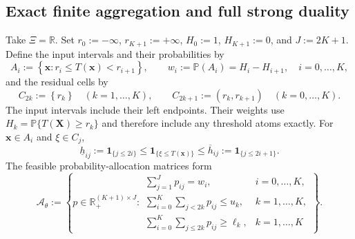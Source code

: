 \subsection{Exact finite aggregation and full strong duality}
\label{app-finite-aggregation}

Take $\Xi=\mathbb R$. Set $r_0:=-\infty$, $r_{K+1}:=+\infty$, $H_0:=1$, $H_{K+1}:=0$, and $J:=2K+1$. Define the input intervals and their probabilities by
\begin{equation}
  A_i:=\left\{\bm x:r_i\le T(\bm x)<r_{i+1}\right\},\qquad
  w_i:=\mathbb P\left(A_i\right)=H_i-H_{i+1},\quad i=0,\ldots,K,
  \label{eq-input-cells}
\end{equation}
and the residual cells by
\begin{equation}
  C_{2k}:=\left\{r_k\right\}\quad(k=1,\ldots,K),\qquad
  C_{2k+1}:=\left(r_k,r_{k+1}\right)\quad(k=0,\ldots,K).
  \label{eq-residual-cells}
\end{equation}
The input intervals include their left endpoints. Their weights use $H_k=\mathbb P\{T(\bm X)\ge r_k\}$ and therefore include any threshold atoms exactly. For $\bm x\in A_i$ and $\xi\in C_j$,
\begin{equation}
  \underline h_{ij}:=\mathbf1_{\{j\le2i\}}
  \le\mathbf1_{\{\xi\le T(\bm x)\}}
  \le\overline h_{ij}:=\mathbf1_{\{j\le2i+1\}}.
  \label{eq-cell-costs}
\end{equation}
The feasible probability-allocation matrices form
\begin{equation}
  \mathcal A_\theta:=\left\{p\in\mathbb R_+^{(K+1)\times J}:
  \begin{array}{ll}
    \displaystyle\sum_{j=1}^Jp_{ij}=w_i,&i=0,\ldots,K,\\[1mm]
    \displaystyle\sum_{i=0}^K\sum_{j<2k}p_{ij}\le u_k,&k=1,\ldots,K,\\[1mm]
    \displaystyle\sum_{i=0}^K\sum_{j\le2k}p_{ij}\ge\ell_k,&k=1,\ldots,K
  \end{array}\right\}.
  \label{eq-cell-mass-polytope}
\end{equation}


